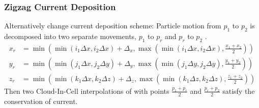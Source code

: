 \documentclass[5pt]{beamer}
\begin{document}
  \begin{frame}
  \frametitle{Zigzag Current Deposition}
  Alternatively change current deposition scheme: Particle motion from $p_1$ to $p_2$ is decomposed into two separate movements, $p_1$ to $p_r$ and $p_r$ to $p_2$ \cite{fallahi2020mithra}.
  {\scriptsize
  \begin{align*}
      x_r &= \min\left(\min(i_1\Delta x, i_2 \Delta x) + \Delta_x, \max\left(\min(i_1\Delta x, i_2 \Delta x), \frac{x_1 + x_2}{2}\right)\right)\\
      y_r &= \min\left(\min(j_1\Delta x, j_2 \Delta y) + \Delta_y, \max\left(\min(j_1\Delta y, j_2 \Delta y), \frac{y_1 + y_2}{2}\right)\right)\\
      z_r &= \min\left(\min(k_1\Delta x, k_2 \Delta z) + \Delta_z, \max\left(\min(k_1\Delta z, k_2 \Delta z), \frac{z_1 + z_2}{2}\right)\right)
  \end{align*}
  }%
  Then two Cloud-In-Cell interpolations of with points $\frac{p_1 + p_r}{2}$ and $\frac{p_r + p_2}{2}$ \cite{UMEDA200373} satisfy the conservation of current.
  \end{frame}
\end{document}
